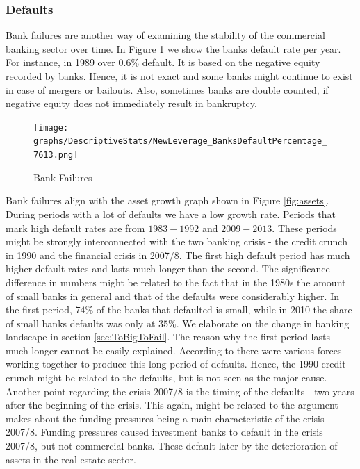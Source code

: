 \documentclass[12pt, a4paper]{article} %
\begin{document}

\subsubsection{Defaults}

Bank failures are another way of examining the stability of the commercial banking sector over time. In Figure \ref{fig:banks_default} we show the banks default rate per year. For instance, in 1989 over $0.6\%$ default. It is based on the negative equity recorded by banks. Hence, it is not exact and some banks might continue to exist in case of mergers or bailouts. Also, sometimes banks are double counted, if negative equity does not immediately result in bankruptcy.

\begin{figure}[H]
\texttt{[image: graphs/DescriptiveStats/NewLeverage\_BanksDefaultPercentage\_7613.png]}
\centering
\caption{Bank Failures}
\label{fig:banks_default}
\end{figure}


Bank failures align with the asset growth graph shown in Figure \ref{fig:assets}. During periods with a lot of defaults we have a low growth rate. Periods that mark high default rates are from $1983-1992$ and $2009-2013$. These periods might be strongly interconnected with the two banking crisis - the credit crunch in 1990 and the financial crisis in 2007/8. The first high default period has much higher default rates and lasts much longer than the second.
The significance difference in numbers might be related to the fact that in the 1980s the amount of small banks in general and that of the defaults were considerably higher.  In the first period, $74\%$ of the banks that defaulted is small, while in 2010 the share of small banks defaults was only at $35\%$. We elaborate on the change in banking landscape in section \ref{sec:ToBigToFail}. The reason why the first period lasts much longer cannot be easily explained. According to \citet{federal1997history} there were various forces working together to produce this long period of defaults. Hence, the 1990 credit crunch might be related to the defaults, but is not seen as the major cause.
Another point regarding the crisis 2007/8 is the timing of the defaults - two years after the beginning of the crisis. This again, might be related to the argument \cite{antoniades2019commercial} makes about the funding pressures being a main characteristic of the crisis 2007/8. Funding pressures caused investment banks to default in the crisis 2007/8, but not commercial banks. These default later by the deterioration of assets in the real estate sector.
\end{document}
